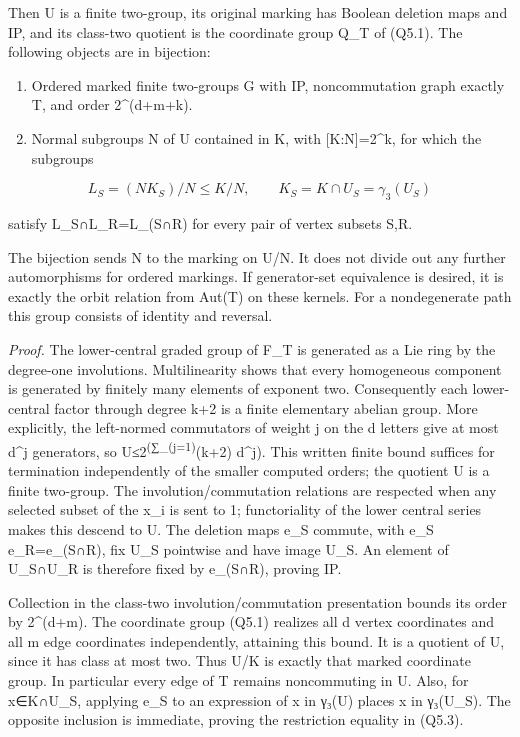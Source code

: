 \documentclass[
  10pt,
  letterpaper,
]{article}
\providecommand{\tightlist}{%
  \setlength{\itemsep}{0pt}\setlength{\parskip}{0pt}}
\begin{document}
Then U is a finite two-group, its original marking has Boolean deletion
maps and IP, and its class-two quotient is the coordinate group Q\_T of
(Q5.1). The following objects are in bijection:

\begin{enumerate}
\def\labelenumi{\arabic{enumi}.}
\tightlist
\item
  Ordered marked finite two-groups G with IP, noncommutation graph
  exactly T, and order 2\^{}(d+m+k).
\item
  Normal subgroups N of U contained in K, with {[}K:N{]}=2\^{}k, for
  which the subgroups
\end{enumerate}

\[
L_S=(N K_S)/N\le K/N,
\qquad K_S=K\cap U_S=\gamma_3(U_S)
\tag{Q5.3}
\]

satisfy L\_S∩L\_R=L\_(S∩R) for every pair of vertex subsets S,R.

The bijection sends N to the marking on U/N. It does not divide out any
further automorphisms for ordered markings. If generator-set equivalence
is desired, it is exactly the orbit relation from Aut(T) on these
kernels. For a nondegenerate path this group consists of identity and
reversal.

\emph{Proof.} The lower-central graded group of F\_T is generated as a
Lie ring by the degree-one involutions. Multilinearity shows that every
homogeneous component is generated by finitely many elements of exponent
two. Consequently each lower-central factor through degree k+2 is a
finite elementary abelian group. More explicitly, the left-normed
commutators of weight j on the d letters give at most d\^{}j generators,
so \textbar U\textbar≤2\textsuperscript{(∑\_(j=1)}(k+2) d\^{}j). This
written finite bound suffices for termination independently of the
smaller computed orders; the quotient U is a finite two-group. The
involution/commutation relations are respected when any selected subset
of the x\_i is sent to 1; functoriality of the lower central series
makes this descend to U. The deletion maps e\_S commute, with e\_S
e\_R=e\_(S∩R), fix U\_S pointwise and have image U\_S. An element of
U\_S∩U\_R is therefore fixed by e\_(S∩R), proving IP.

Collection in the class-two involution/commutation presentation bounds
its order by 2\^{}(d+m). The coordinate group (Q5.1) realizes all d
vertex coordinates and all m edge coordinates independently, attaining
this bound. It is a quotient of U, since it has class at most two. Thus
U/K is exactly that marked coordinate group. In particular every edge of
T remains noncommuting in U. Also, for x∈K∩U\_S, applying e\_S to an
expression of x in γ₃(U) places x in γ₃(U\_S). The opposite inclusion is
immediate, proving the restriction equality in (Q5.3).
\end{document}
